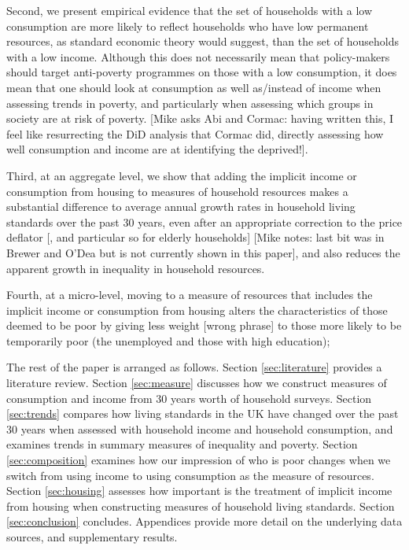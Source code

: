 Second, we present empirical evidence that the set of households with a low consumption are more likely to reflect households who have low permanent resources, as standard economic theory would suggest, than the set of households with a low income. Although this does not necessarily mean that policy-makers should target anti-poverty programmes on those with a low consumption, it does mean that one should look at consumption as well as/instead of income when assessing trends in poverty, and particularly when assessing which groups in society are at risk of poverty. [Mike asks Abi and Cormac: having written this, I feel like resurrecting the DiD analysis that Cormac did, directly assessing how well consumption and income are at identifying the deprived!]. 

Third, at an aggregate level, we show that adding the implicit income or consumption from housing to measures of household resources makes a substantial difference to average annual growth rates in household living standards over the past 30 years, even after an appropriate correction to the price deflator [, and particular so for elderly households] [Mike notes: last bit was in Brewer and O'Dea but is not currently shown in this paper], and also reduces the apparent growth in inequality in household resources. 

Fourth, at a micro-level, moving to a measure of resources that includes 
the implicit income or consumption from housing alters the characteristics of those deemed to be poor by giving less weight [wrong phrase] to those more likely to be temporarily poor (the unemployed and those with high education);



The rest of the paper is arranged as follows.  Section \ref{sec:literature} provides a literature review. Section \ref{sec:measure} discusses how we construct measures of consumption and income from 30 years worth of household surveys.  Section \ref{sec:trends} compares how living standards in the UK have changed over the past 30 years when assessed with household income and household consumption, and examines trends in summary measures of inequality and poverty. Section \ref{sec:composition} examines how our impression of who is poor changes when we switch from using income to using consumption as the measure of resources. Section \ref{sec:housing} assesses how important is the treatment of implicit income from housing when constructing measures of household living standards. Section \ref{sec:conclusion} concludes. Appendices provide more detail on the underlying data sources, and supplementary results.
